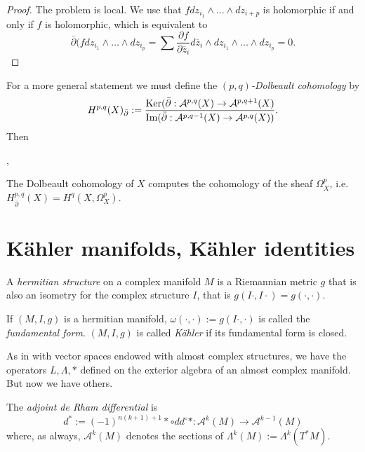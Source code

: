 \begin{proof}
The problem is local.
We use that $f dz_{i_1}\wedge…\wedge dz_{i+p}$ is holomorphic
if and only if $f$ is holomorphic, which is equivalent to
$$
\bar\partial(fdz_{i_1}\wedge…\wedge dz_{i_p}
=\sum \frac{\partial f}{\partial \overline{z}_i}d\overline{z}_i
\wedge dz_{i_1}\wedge…\wedge dz_{i_p}=0.
$$
\end{proof}

\noindent
For a more general statement we must define
the {\it $(p,q)$-Dolbeault cohomology} by
 $$
H^{p,q}(X)_{\bar\partial}
:=\frac{\mathop{\mathrm{Ker}} (\bar\partial:\mathcal{A}^{p,q}(X) \to \mathcal{A}^{p,q+1}(X)}
{\text{Im}(\bar\partial:\mathcal{A}^{p,q-1}(X) \to \mathcal{A}^{p,q}(X))}.
$$
Then

\begin{theorem}[Dolbeault]
\label{theorem-dolbeault}
\begin{reference}
\cite[Corollary 2.6.21]{huc}, \cite[Theorem 4.2]{voi}
\end{reference} 
The Dolbeault cohomology of $X$ computes the cohomology
of the sheaf $\Omega^p_X$, i.e. $H^{p,q}_{\bar\partial}(X)=H^q(X,\Omega^p_X)$.
\end{theorem}



\section{Kähler manifolds, Kähler identities}
\label{section-kahler}


\begin{definition}
\label{definition-hermitian-structure}
A {\it hermitian structure} on a complex manifold $M$
is a Riemannian metric $g$ that is also an isometry for
the complex structure $I$, that is $g(I\cdot,I\cdot)=g(\cdot,\cdot)$.
\end{definition}

\begin{definition}
\label{definition-fundamental-form}
If $(M,I,g)$ is a hermitian manifold,
$\omega(\cdot,\cdot):=g(I\cdot,\cdot)$
is called the {\it fundamental form}.
$(M,I,g)$ is called {\it Kähler} if its fundamental form
is closed.
\end{definition}

\noindent
As in with vector spaces endowed with almost complex structures,
we have the operators $L,\Lambda,*$ defined on the exterior algebra
of an almost complex manifold.
But now we have others.

\begin{definition}
\label{definition-adjoint-de-rham-differential}
The {\it adjoint de Rham differential} is
$$
d^*:=(-1)^{n(k+1)+1}*\circ dd^\circ *
:\mathcal{A}^k(M) \to \mathcal{A}^{k-1}(M)
$$
where, as always, $\mathcal{A}^k(M)$ denotes the
sections of $\Lambda^k(M):=\Lambda^k(T^*M)$.
\end{definition}

